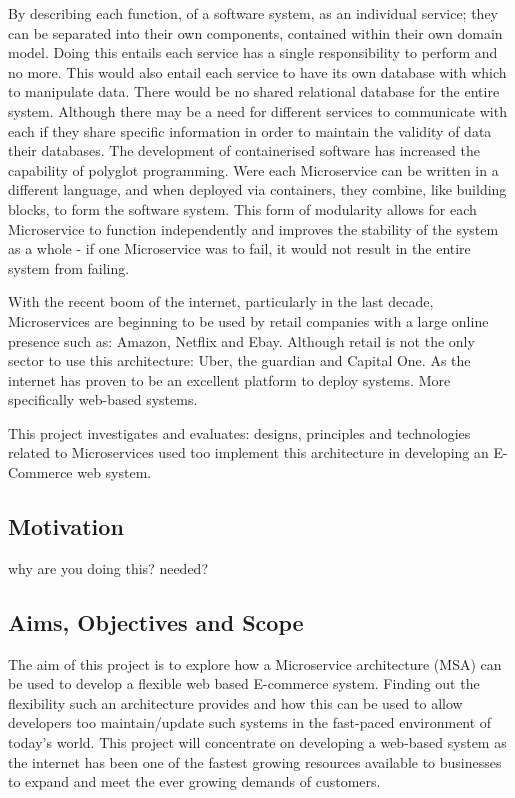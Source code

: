 	By describing each function, of a software system, as an individual service; they can be separated into their own components, contained within their own domain model. Doing this entails each service has a single responsibility to perform and no more. This would also entail each service to have its own database with which to manipulate data. There would be no shared relational database for the entire system. Although there may be a need for different services to communicate with each if they share specific information in order to maintain the validity of data their databases. The development of containerised software has increased the capability of polyglot programming. Were each Microservice can be written in a different language, and when deployed via containers, they combine, like building blocks, to form the software system. This form of modularity allows for each Microservice to function independently and improves the stability of the system as a whole - if one Microservice was to fail, it would not result in the entire system from failing. 
	
	With the recent boom of the internet, particularly in the last decade, Microservices are beginning to be used by retail companies with a large online presence such as: Amazon, Netflix and Ebay. Although retail is not the only sector to use this architecture: Uber, the guardian and Capital One. As the internet has proven to be an excellent platform to deploy systems. More specifically web-based systems.
	
	This project investigates and evaluates: designs, principles and technologies related to Microservices used too implement this architecture in developing an E-Commerce web system.
	\subsection{Motivation}
	why are you doing this? needed?
	
	\subsection{Aims, Objectives and Scope}
	The aim of this project is to explore how a Microservice architecture (MSA) can be used to develop a flexible web based E-commerce system. Finding out the flexibility such an architecture provides and how this can be used to allow developers too maintain/update such systems in the fast-paced environment of today’s world. This project will concentrate on developing a web-based system as the internet has been one of the fastest growing resources available to businesses to expand and meet the ever growing demands of customers. 
	 
